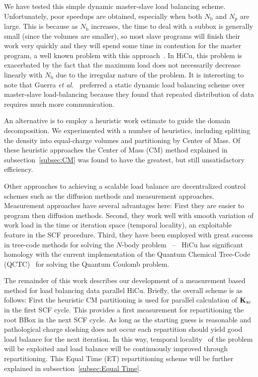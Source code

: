 \commentoutA{\documentclass[prb,aps,twocolumn,twocolumngrid]{revtex4}}
\newcommand{\Kxc}{{\bf K}_{\mathrm{xc}}}
\newcommand{\Np}{N_{\mathrm{p}}} \newcommand{\Nbox}{N_{\mathrm{b}}}
\begin{document}
We have tested this simple dynamic master-slave load balancing
scheme. Unfortunately, poor speedups are obtained, especially when
both $\Nbox$ and $\Np$ are large.  This is because as $\Nbox$
increases, the time to deal with a subbox is generally small (since
the volumes are smaller), so most slave programs will finish their
work very quickly and they will spend some time in contention for the
master program, a well known problem with this
approach~\cite{Wilkinson99,Wilson95}.  In HiCu, this problem is exacerbated by
the fact that the maximum load does not necessarily decrease linearly
with $\Nbox$ due to the irregular nature of the problem.  It is
interesting to note that Guerra {\it et al.}\/~\cite{Guerra_95}
preferred a static dynamic load balancing scheme over master-slave
load-balancing because they found that repeated distribution of data
requires much more communication.

An alternative is to employ a heuristic work estimate to guide the
domain decomposition.  We experimented with a number of heuristics,
including splitting the density into equal-charge volumes and
partitioning by Center of Mass.  Of these heuristic approaches the
Center of Mass (CM) method explained in subsection~\ref{subsec:CM} was
found to have the greatest, but still unsatisfactory efficiency.

Other approaches to achieving a scalable load balance are
decentralized control schemes such as the diffusion methods \cite{}
and measurement approaches.  Measurement approaches have several
advantages here: First they are easier to program then diffusion
methods.  Second, they work well with smooth variation of work load in
the time or iteration space (temporal locality), an exploitable
feature in the SCF procedure.  Third, they have been employed with
great success in tree-code methods for solving the $N$-body problem
\cite{JPilkington96,warren:92_article,Grama94_article,Warren95b,Singh93,Singh_95v27,Grama_98v24} ~--~
HiCu has significant homology with the current implementation of the
Quantum Chemical Tree-Code
(QCTC)~\cite{MChallacombe96,MChallacombe96B,MChallacombe97} for
solving the Quantum Coulomb problem.

The remainder of this work describes our development of a measurement
based method for load balancing data parallel HiCu.  Briefly, the
overall scheme is as follows: First the heuristic CM partitioning is
used for parallel calculation of $\Kxc$ in the first SCF cycle.  This
provides a first measurement for repartitioning the root BBox in the
next SCF cycle.  As long as the starting guess is reasonable and
pathological charge sloshing does not occur each repartition should
yield good load balance for the next iteration. In this way, temporal
locality~\cite{JPilkington96} of the problem will be exploited and
load balance will be continuously improved through
repartitioning. This Equal Time (ET) repartitioning scheme will be
further explained in subsection~\ref{subsec:Equal Time}.
\end{document}
